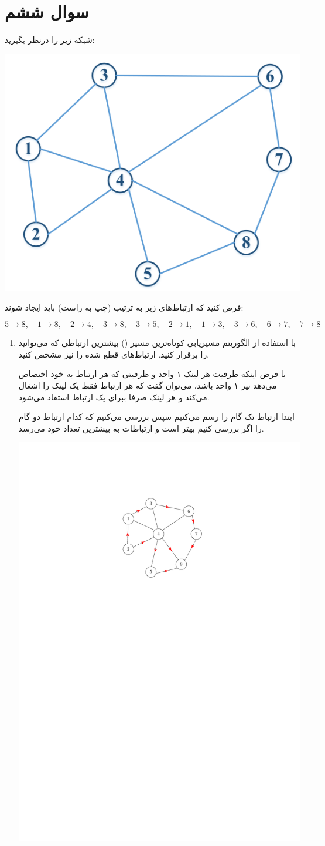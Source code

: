 \section{سوال ششم}

شبکه زیر را درنظر بگیرید:

\begin{center}
	\includegraphics*[width=0.5\linewidth]{pics/img1.png}
\end{center}


فرض کنید که ارتباط‌های زیر به ترتیب (چپ به راست) باید ایجاد شوند:

\begin{latin}
	$$ 
	5 \rightarrow 8, \quad 1 \rightarrow 8, \quad 2 \rightarrow 4, \quad 3 \rightarrow 8, \quad 3 \rightarrow 5, \quad 2 \rightarrow 1, \quad 1 \rightarrow 3, \quad 3 \rightarrow 6, \quad 6 \rightarrow 7, \quad 7 \rightarrow 8
	$$
\end{latin}

\begin{enumerate}
	\item 
	با استفاده از الگوریتم مسیریابی کوتاه‌ترین مسیر () بیشترین ارتباطی که می‌توانید را برقرار کنید. ارتباط‌های قطع شده را نیز مشخص کنید.
	\begin{qsolve}
		با فرض اینکه ظرفیت هر لینک ۱ واحد و ظرفیتی که هر ارتباط به خود اختصاص می‌دهد نیز ۱ واحد باشد، می‌توان گفت که هر ارتباط فقط یک لینک را اشغال می‌کند و هر لینک صرفا ببرای یک ارتباط استفاد می‌شود.
		
		ابتدا ارتباط تک گام را رسم می‌کنیم سپس بررسی می‌کنیم که کدام ارتباط دو گام را اگر بررسی کنیم بهتر است و ارتباطات به بیشترین تعداد خود می‌رسد.
		
		\begin{center}
			\includegraphics*[width=0.4\linewidth]{pics/Q6_a.pdf}
		\end{center}
	\end{qsolve}
	\newpage
\end{enumerate}


